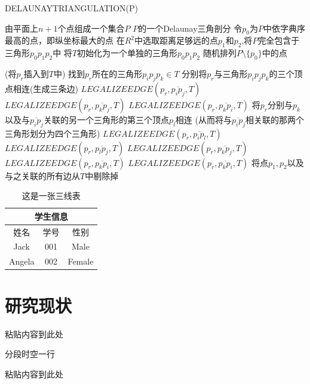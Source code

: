 \begin{algorithm}
	\caption{DELAUNAYTRIANGULATION(P)}
	\begin{algorithmic}[1] %
		\Require 由平面上$n+1$个点组成一个集合$P$ 
		\Ensure $P$的一个Delaunay三角剖分
		\State 令$p_0$为$P$中依字典序最高的点，即纵坐标最大的点
		\State 在$R^2$中选取距离足够远的点$p_1$和$p_2$,将$P$完全包含于三角形$p_0p_1p_2$中
		\State 将$T$初始化为一个单独的三角形$p_0p_1p_2$
		\State 随机排列$P\setminus\{p_0\}$中的点 
		
		\State (将$p_r$插入到$T$中)
		找到$p_r$所在的三角形$p_ip_jp_k \in T$ 
		\State 分别将$p_r$与三角形$p_ip_jp_k$的三个顶点相连(生成三条边) 
		\State	$LEGALIZEEDGE(p_r, \overline{p_ip_j}, T)$
		\State	$LEGALIZEEDGE(p_r, \overline{p_kp_j}, T)$ 
		\State	$LEGALIZEEDGE(p_r, \overline{p_kp_i}, T)$ 
		\State 将$p_r$分别与$p_k$以及与$\overline{p_ip_j}$关联的另一个三角形的第三个顶点$p_l$相连 
		\State (从而将与$\overline{p_ip_j}$相关联的那两个三角形划分为四个三角形) 
		\State $LEGALIZEEDGE(p_r, \overline{p_ip_l}, T)$ 
		\State $LEGALIZEEDGE(p_r, \overline{p_lp_j}, T)$ 
		\State $LEGALIZEEDGE(p_r, \overline{p_kp_j}, T)$ 
		\State $LEGALIZEEDGE(p_r, \overline{p_kp_i}, T)$ 
		\State $LEGALIZEEDGE(p_r, \overline{p_kp_i}, T)$ 
		\EndIf
		\EndFor
		\State 将点$p_1,p_2$以及与之关联的所有边从$T$中剔除掉 
		\State {}
	\end{algorithmic}
\end{algorithm}

\begin{table}[!htbp] 
	\centering
	\begin{tabular}{|c|c|c|}
		\hline
		\multicolumn{3}{|c|}{学生信息}\\ %
		\hline
		姓名&学号&性别\\
		\hline
		Jack& 001& Male\\
		\hline
		Angela& 002& Female\\
		\hline
	\end{tabular}
	\caption{这是一张三线表}
\end{table}

\section{研究现状}
粘贴内容到此处\cite{7956190}

分段时空一行

粘贴内容到此处

